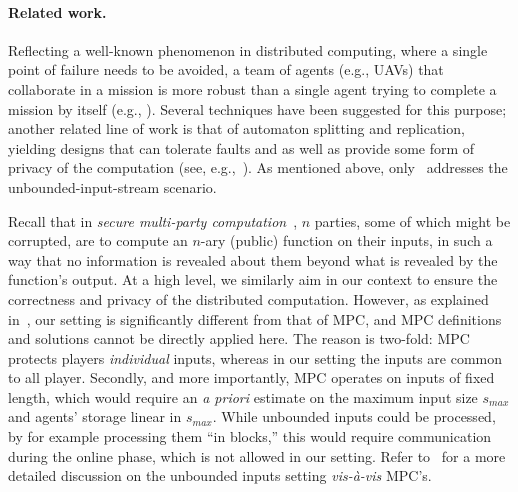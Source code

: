 \documentclass[letterpaper,11pt]{article}
\newcommand{\ignore}[1]{}
               {}
\begin{document}
\vspace{-.1in}

\paragraph{Related work.} 
Reflecting a well-known phenomenon in distributed computing, where
a single point of failure needs to be avoided,
a team of agents (e.g., UAVs)  that collaborate in a mission
is more robust than a single agent trying
to complete a mission by itself (e.g., \cite{Bamberger,BDDS10}). 
Several techniques have been  suggested for this purpose;
another related line of work is that of automaton splitting and
replication, yielding
designs that can tolerate faults and as well as provide
some form of privacy of the computation
(see, e.g.,~\cite{DKS07,DLY07,DGKPS10,DGGK09,DGGK11}).
As mentioned above, 
only~\cite{DGGK11}
addresses the unbounded-input-stream scenario.
\ignore{
Techniques for information-theoretic communication among the participants of 
such systems have been investigated as well~\cite{DO00,BD03,DGGN08,DGKPS10},
some of which might be amenable for enhancement and application to our
scenario as well.\todo{VLAD: which techniques can be amenable? We have unbounded-input non-interactive online phase}
} 



Recall that in {\em secure multi-party
computation}~\cite{DBLP:conf/stoc/GoldreichMW87,BGW88,CCD88}, $n$
parties, some of which might be corrupted, are to compute an $n$-ary
(public) function on their inputs, in such a way that no information
is revealed about them beyond what is revealed by the function's
output.  At a high level, we similarly aim in our context to ensure
the correctness and privacy of the distributed computation. However,
as explained in~\cite{DGGK11}, our setting is significantly different
from that of MPC, and MPC definitions and solutions cannot be directly
applied here.  The reason is two-fold: MPC protects players {\em
individual} inputs, whereas in our setting the inputs are common to
all player.  Secondly, and more importantly, MPC operates on inputs of
fixed length, which would require an {\it a priori} estimate on the 
maximum input size $s_{max}$ and agents' storage linear in $s_{max}$.  
While unbounded inputs could be processed, 
by for example processing them ``in blocks,'' this would require
communication during the online phase, which is not allowed
in our setting. Refer to~\cite{DGGK11} for a more detailed discussion
on the unbounded inputs setting {\em vis-\`{a}-vis} MPC's.
\end{document}
